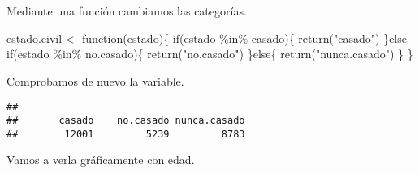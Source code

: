 \documentclass[]{article}
\newenvironment{Shaded}{\begin{snugshade}}{\end{snugshade}}
\newcommand{\ControlFlowTok}[1]{\textcolor[rgb]{0.94,0.87,0.69}{#1}}
\newcommand{\DataTypeTok}[1]{\textcolor[rgb]{0.87,0.87,0.75}{#1}}
\newcommand{\KeywordTok}[1]{\textcolor[rgb]{0.94,0.87,0.69}{#1}}
\newcommand{\NormalTok}[1]{\textcolor[rgb]{0.80,0.80,0.80}{#1}}
\newcommand{\OperatorTok}[1]{\textcolor[rgb]{0.94,0.94,0.82}{#1}}
\newcommand{\StringTok}[1]{\textcolor[rgb]{0.80,0.58,0.58}{#1}}
\begin{document}
Mediante una función cambiamos las categorías.

\begin{Shaded}
\begin{Highlighting}[]
\NormalTok{estado.civil \textless{}{-}}\StringTok{ }\ControlFlowTok{function}\NormalTok{(estado)\{}
  \ControlFlowTok{if}\NormalTok{(estado }\OperatorTok{\%in\%}\StringTok{ }\NormalTok{casado)\{}
    \KeywordTok{return}\NormalTok{(}\StringTok{"casado"}\NormalTok{)}
\NormalTok{  \}}\ControlFlowTok{else} \ControlFlowTok{if}\NormalTok{(estado }\OperatorTok{\%in\%}\StringTok{ }\NormalTok{no.casado)\{}
    \KeywordTok{return}\NormalTok{(}\StringTok{"no.casado"}\NormalTok{)}
\NormalTok{  \}}\ControlFlowTok{else}\NormalTok{\{}
    \KeywordTok{return}\NormalTok{(}\StringTok{"nunca.casado"}\NormalTok{)}
\NormalTok{  \}}
\NormalTok{\}}
\end{Highlighting}
\end{Shaded}

\begin{Shaded}
\end{Shaded}

Comprobamos de nuevo la variable.

\begin{Shaded}
\end{Shaded}

\begin{verbatim}
## 
##       casado    no.casado nunca.casado 
##        12001         5239         8783
\end{verbatim}

Vamos a verla gráficamente con edad.

\begin{Shaded}
\end{Shaded}
\end{document}
